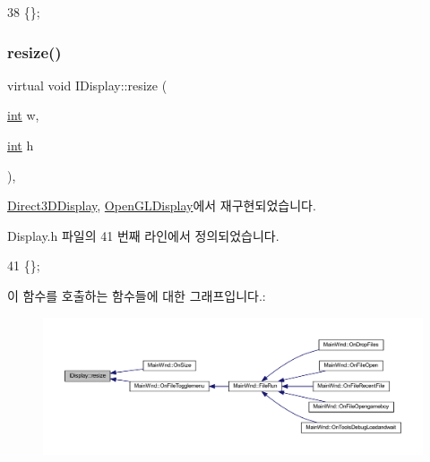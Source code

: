 \begin{DoxyCode}
38 \{\};
\end{DoxyCode}
\mbox{\label{class_i_display_ad0b4ba99f59edd7a6857e3b3941b3ba2}} 
\subsubsection{\texorpdfstring{resize()}{resize()}}
{\footnotesize\ttfamily virtual void I\+Display\+::resize (\begin{DoxyParamCaption}\item[{\mbox{\hyperlink{_util_8cpp_a0ef32aa8672df19503a49fab2d0c8071}{int}}}]{w,  }\item[{\mbox{\hyperlink{_util_8cpp_a0ef32aa8672df19503a49fab2d0c8071}{int}}}]{h }\end{DoxyParamCaption})\hspace{0.3cm}{\ttfamily [inline]}, {\ttfamily [virtual]}}



\mbox{\hyperlink{class_direct3_d_display_a0e6e22fc78ec40c164ec7943581bcf7f}{Direct3\+D\+Display}}, \mbox{\hyperlink{class_open_g_l_display_aac55119e649c9530a19b6b02fcd4910b}{Open\+G\+L\+Display}}에서 재구현되었습니다.



Display.\+h 파일의 41 번째 라인에서 정의되었습니다.


\begin{DoxyCode}
41 \{\};
\end{DoxyCode}
이 함수를 호출하는 함수들에 대한 그래프입니다.\+:
\nopagebreak
\begin{figure}[H]
\begin{center}
\leavevmode
\includegraphics[width=350pt]{class_i_display_ad0b4ba99f59edd7a6857e3b3941b3ba2_icgraph}
\end{center}
\end{figure}
\mbox{\label{class_i_display_a2f7a55f63c5e4b24245aa88228afab68}} 
